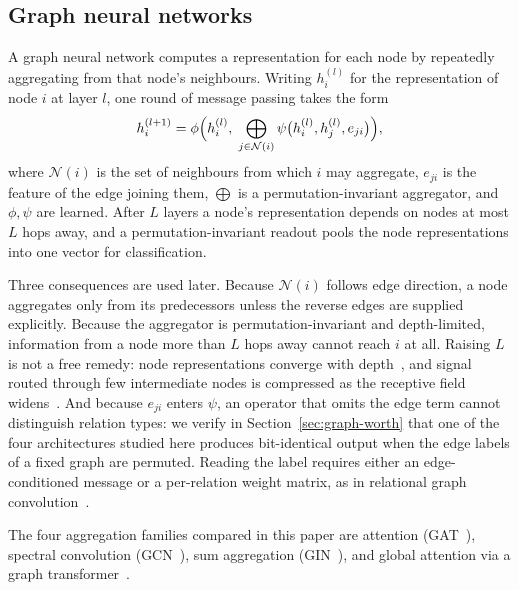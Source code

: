 \subsection{Graph neural networks}
A graph neural network computes a representation for each node by repeatedly
aggregating from that node's neighbours. Writing $h_i^{(l)}$ for the
representation of node $i$ at layer $l$, one round of message passing takes the
form
\[
  h_i^{(l+1)} = \phi\Bigl(h_i^{(l)},\; \bigoplus_{j \in \mathcal{N}(i)}
                    \psi\bigl(h_i^{(l)}, h_j^{(l)}, e_{ji}\bigr)\Bigr),
\]
where $\mathcal{N}(i)$ is the set of neighbours from which $i$ may aggregate,
$e_{ji}$ is the feature of the edge joining them, $\bigoplus$ is a
permutation-invariant aggregator, and $\phi, \psi$ are learned. After $L$ layers
a node's representation depends on nodes at most $L$ hops away, and a
permutation-invariant readout pools the node representations into one vector for
classification.

Three consequences are used later. Because $\mathcal{N}(i)$ follows edge
direction, a node aggregates only from its predecessors unless the reverse edges
are supplied explicitly. Because the aggregator is permutation-invariant and
depth-limited, information from a node more than $L$ hops away cannot reach $i$
at all. Raising $L$ is not a free remedy: node representations converge with
depth~\citep{li2018deeper,oono2020graph}, and signal routed through few
intermediate nodes is compressed as the receptive field
widens~\citep{alon2021bottleneck,topping2022understanding}. And because $e_{ji}$ enters $\psi$, an operator that omits the edge term
cannot distinguish relation types: we verify in
Section~\ref{sec:graph-worth} that one of the four architectures studied here
produces bit-identical output when the edge labels of a fixed graph are
permuted. Reading the label requires either an edge-conditioned message or a
per-relation weight matrix, as in relational graph
convolution~\citep{schlichtkrull2018modeling}.

The four aggregation families compared in this paper are attention
(GAT~\citep{DBLP:conf/iclr/VelickovicCCRLB18}), spectral convolution
(GCN~\citep{Kipf2016SemiSupervisedCW}), sum aggregation
(GIN~\citep{xu2018how,morris2019weisfeiler}), and global attention via a graph
transformer~\citep{3454287.3455360}.

